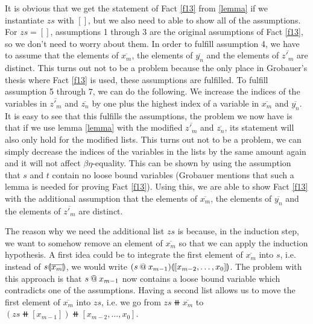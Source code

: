 It is obvious that we get the statement of Fact \ref{f13} from \ref{lemma} if we instantiate $zs$ with $[]$, but we also need to able to show all of the assumptions. For $zs = []$,  assumptions 1 through 3 are the original assumptions of Fact \ref{f13}, so we don't need to worry about them. In order to fulfill assumption 4, we have to assume that the elements of $\overline{x_m}$, the elements of $\overline{y_n}$ and the elements of $\overline{z'_m}$ are distinct. This turns out not to be a problem because the only place in Grobauer's thesis where Fact \ref{f13} is used, these assumptions are fulfilled. To fulfill  assumption 5 through 7, we can do the following. We increase the indices of the variables in $\overline{z'_m}$ and $\overline{z_n}$ by one plus the highest index of a variable in $\overline{x_m}$ and $\overline{y_n}$. It is easy to see that this fulfills the assumptions, the problem we now have is that if we use lemma \ref{lemma} with the modified $\overline{z'_m}$ and $\overline{z_n}$, its statement will also only hold for the modified lists. This turns out not to be a problem, we can simply decrease the indices of the variables in the lists by the same amount again and it will not affect $\beta\eta$-equality. This can be shown by using the assumption that $s$ and $t$ contain no loose bound variables (Grobauer mentions that such a lemma is needed for proving Fact \ref{f13}). Using this, we are able to show Fact \ref{f13} with the additional assumption that the elements of $\overline{x_m}$, the elements of $\overline{y_n}$ and the elements of $\overline{z'_m}$ are distinct.

The reason why we need the additional list $zs$ is because, in the induction step, we want to somehow remove an element of $\overline{x_m}$ so that we can apply the induction hypothesis. A first idea could be to integrate the first element of $\overline{x_m}$ into $s$, i.e. instead of $s \llparenthesis \overline{x_m} \rrparenthesis$, we would write $(s \mathbin{@} x_{m - 1})  \llparenthesis [x_{m - 2}, \dots, x_0] \rrparenthesis$. The problem with this approach is that $s \mathbin{@} x_{m - 1}$ now contains a loose bound variable which contradicts one of the assumptions. Having a second list allows us to move the first element of $\overline{x_m}$ into $zs$, i.e. we go from $zs \doubleplus \overline{x_m}$ to $(zs \doubleplus [x_{m - 1}]) \doubleplus [x_{m - 2}, \dots, x_0]$.

